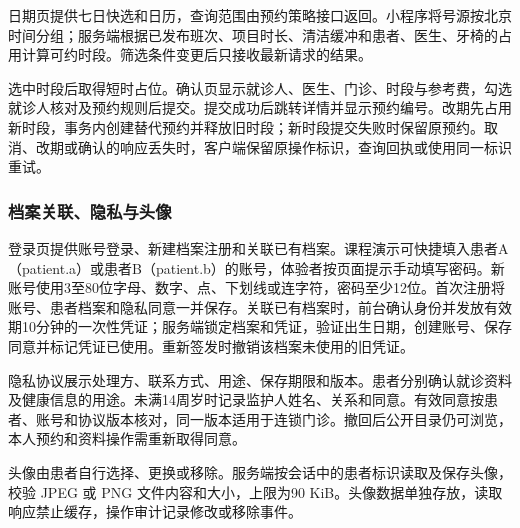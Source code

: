 \documentclass[UTF8,12pt,a4paper,fontset=none]{ctexart}
\begin{document}
日期页提供七日快选和日历，查询范围由预约策略接口返回。小程序将号源按北京时间分组；服务端根据已发布班次、项目时长、清洁缓冲和患者、医生、牙椅的占用计算可约时段。筛选条件变更后只接收最新请求的结果。\par
选中时段后取得短时占位。确认页显示就诊人、医生、门诊、时段与参考费，勾选就诊人核对及预约规则后提交。提交成功后跳转详情并显示预约编号。改期先占用新时段，事务内创建替代预约并释放旧时段；新时段提交失败时保留原预约。取消、改期或确认的响应丢失时，客户端保留原操作标识，查询回执或使用同一标识重试。\par
\subsubsection{档案关联、隐私与头像}
登录页提供账号登录、新建档案注册和关联已有档案。课程演示可快捷填入患者A（patient.a）或患者B（patient.b）的账号，体验者按页面提示手动填写密码。新账号使用3至80位字母、数字、点、下划线或连字符，密码至少12位。首次注册将账号、患者档案和隐私同意一并保存。关联已有档案时，前台确认身份并发放有效期10分钟的一次性凭证；服务端锁定档案和凭证，验证出生日期，创建账号、保存同意并标记凭证已使用。重新签发时撤销该档案未使用的旧凭证。\par
隐私协议展示处理方、联系方式、用途、保存期限和版本。患者分别确认就诊资料及健康信息的用途。未满14周岁时记录监护人姓名、关系和同意。有效同意按患者、账号和协议版本核对，同一版本适用于连锁门诊。撤回后公开目录仍可浏览，本人预约和资料操作需重新取得同意。\par
头像由患者自行选择、更换或移除。服务端按会话中的患者标识读取及保存头像，校验 JPEG 或 PNG 文件内容和大小，上限为90 KiB。头像数据单独存放，读取响应禁止缓存，操作审计记录修改或移除事件。\par
\end{document}
